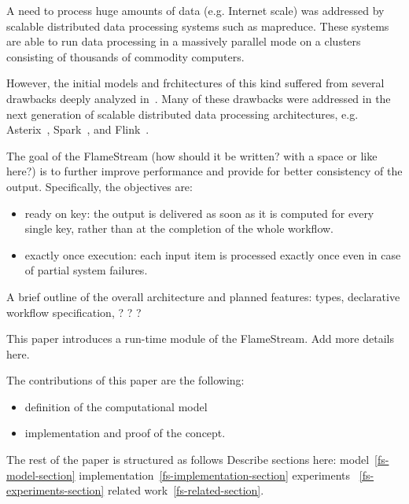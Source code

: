 
\label {fs-intro-seciton}

A need to process huge amounts of data (e.g. Internet scale) was addressed by scalable distributed data processing systems such as  mapreduce. These systems are able to run data processing in a massively parallel mode on a clusters consisting of thousands of commodity computers. 

However, the initial models and frchitectures of this kind suffered from several drawbacks deeply analyzed in~\cite{Doulkeridis:2014:SLA:2628707.2628782,}. Many of these drawbacks were addressed in the next generation of scalable distributed data processing architectures, e.g. Asterix~\cite{Alsubaiee:2012:ASW:2331801.2331803}, Spark~\cite{Franklin}, and Flink~\cite{Carbone:2017:SMA:3137765.3137777}. 

The goal of the FlameStream (how should it be written? with a space or like here?) is to further improve performance and provide for better consistency of the output.  Specifically, the objectives are:

\begin {itemize}
\item ready on key: the output is delivered as soon as it is computed for every single key, rather than at the completion of  the whole workflow.
\item exactly once execution: each input item is processed exactly once even in case of partial system failures. 
\end {itemize}

A brief outline of the overall architecture and planned features: types, declarative workflow specification, ? ? ?

This paper introduces a run-time module of the  FlameStream. 
Add more details here.

The contributions of this paper are the following:

\begin {itemize}
\item definition of the computational model
\item implementation and proof of the concept.
\end {itemize}

The rest of the paper is structured as follows 
Describe sections here: model~\ref {fs-model-section}
implementation~\ref{fs-implementation-section}
experiments ~\ref{fs-experiments-section}
related work~\ref{fs-related-section}.


\endinput
